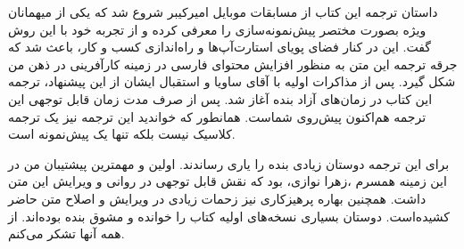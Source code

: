 داستان ترجمه این کتاب از مسابقات موبایل امیرکیبر شروع شد که یکی از
میهمانان ویژه بصورت مختصر پیش‌نمونه‌سازی را معرفی کرده و از تجربه خود با
این روش گفت. این در کنار فضای پویای استارت‌آپ‌ها و راه‌اندازی کسب و کار،
باعث شد که جرقه ترجمه این متن به منظور افزایش محتوای فارسی در زمینه
کارآفرینی در ذهن من شکل گیرد. پس از مذاکرات اولیه با آقای ساویا و
استقبال ایشان از این پیشنهاد، ترجمه این کتاب در زمان‌های آزاد بنده آغاز
شد. پس از صرف مدت زمان قابل توجهی این ترجمه هم‌اکنون پیش‌روی شماست.
همانطور که خواندید این ترجمه نیز یک ترجمه کلاسیک نیست بلکه تنها یک
پیش‌نمونه است.

برای این ترجمه دوستان زیادی بنده را یاری رساندند. اولین و مهمترین
پیشتیبان من در این زمینه همسرم ،زهرا نوازی، بود که نقش قابل توجهی در
روانی و ویرایش این متن داشت. همچنین بهاره پرهیزکاری نیز زحمات زیادی در
ویرایش و اصلاح متن حاضر کشیده‌است. دوستان بسیاری نسخه‌های اولیه کتاب را
خوانده و مشوق بنده بوده‌اند. از همه آنها تشکر می‌کنم.
